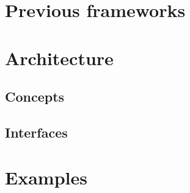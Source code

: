 \section{Previous frameworks}

\section{Architecture}

\subsection{Concepts}

\subsection{Interfaces}

\section{Examples}
